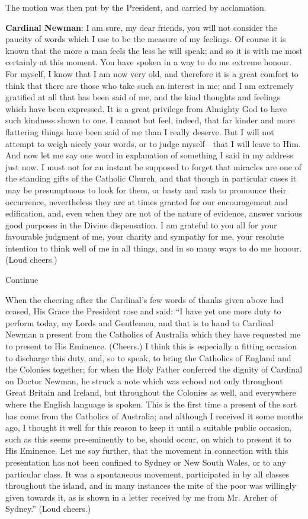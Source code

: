 The motion was then put by the President, and
carried by acclamation.

\textbf{Cardinal Newman}: I am sure, my
dear friends, you will not consider the paucity of words which I use
to be the measure of my feelings. Of course it is known that the more
a man feels the less he will speak; and so it is with me most
certainly at this moment. You have spoken in a way to do me extreme
honour. For myself, I know that I am now very old, and therefore it is
a great comfort to think that there are those who take such an
interest in me; and I am extremely gratified at all that has been said
of me, and the kind thoughts and feelings which have been expressed.
It is a great privilege from Almighty God to have such kindness
shown to one. I cannot but feel, indeed, that far kinder and more
flattering things have been said of me than I really deserve. But I
will not attempt to weigh nicely your words, or to judge myself—that
I will leave to Him. And now let me say one word in explanation of
something I said in my address just now. I must not for an instant be
supposed to forget that miracles are one of the standing gifts of the
Catholic Church, and that though in particular cases it may be
presumptuous to look for them, or hasty and rash to pronounce their
occurrence, nevertheless they are at times granted for our
encouragement and edification, and, even when they are not of the
nature of evidence, answer various good purposes in the Divine
dispensation. I am grateful to you all for your favourable judgment of
me, your charity and sympathy for me, your resolute intention to think
well of me in all things, and in so many ways to do me honour. (Loud
cheers.)

Continue


When the cheering after the Cardinal's few
words of thanks given above had ceased, His Grace the President rose
and said: ``I have yet one more duty to perform today, my Lords
and Gentlemen, and that is to hand to Cardinal Newman a present from
the Catholics of Australia which they have requested me to present to
His Eminence. (Cheers.) I think this is especially a fitting occasion
to discharge this duty, and, so to speak, to bring the Catholics of
England and the Colonies together; for when the Holy Father conferred
the dignity of Cardinal on Doctor Newman, he struck a note which was
echoed not only throughout Great Britain and Ireland, but throughout
the Colonies as well, and everywhere where the English language is
spoken. This is the first time a present of the sort has come from the
Catholics of Australia; and although I received it some months ago, I
thought it well for this reason to keep it until a suitable public
occasion, such as this seems pre-eminently to be, should occur, on
which to present it to His Eminence. Let me say further, that the
movement in connection with this presentation has not been confined to
Sydney or New South Wales, or to any particular class. It was a
spontaneous movement, participated in by all classes throughout the
island, and in many instances the mite of the poor was willingly given
towards it, as is shown in a letter received by me from Mr. Archer of
Sydney.'' (Loud cheers.)

